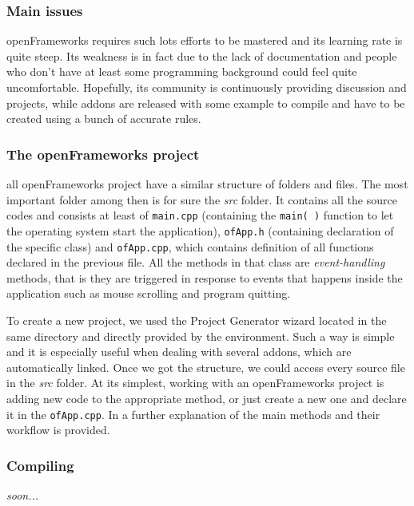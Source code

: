 \documentclass[journal]{IEEEtran}
\begin{document}
\subsubsection{Main issues}
openFrameworks requires such lots efforts to be mastered and its learning rate is quite steep. Its weakness is in fact due to the lack of documentation and people who don't have at least some programming background could feel quite uncomfortable. Hopefully, its community is continuously providing discussion and projects, while addons are released with some example to compile and have to be created using a bunch of accurate rules.

\subsubsection{The openFrameworks project}
all openFrameworks project have a similar structure of folders and files. The most important folder among then is for sure the \emph{src} folder. It contains all the source codes and consists at least of \texttt{main.cpp} (containing the \texttt{main( )} function to let the operating system start the application), \texttt{ofApp.h} (containing declaration of the specific class) and \texttt{ofApp.cpp}, which contains definition of all functions declared in the previous file. All the methods in that class are \emph{event-handling} methods, that is they are triggered in response to events that happens inside the application such as mouse scrolling and program quitting.%

To create a new project, we used the Project Generator wizard located in the same directory and directly provided by the environment. Such a way is simple and it is especially useful when dealing with several addons, which are automatically linked. Once we got the structure, we could access every source file in the \emph{src} folder. At its simplest, working with an openFrameworks project is adding new code to the appropriate method, or just create a new one and declare it in the \texttt{ofApp.cpp}. In \cite{} a further explanation of the main methods and their workflow is provided.

\subsubsection{Compiling}
\textit{soon...}

 
\end{document}
